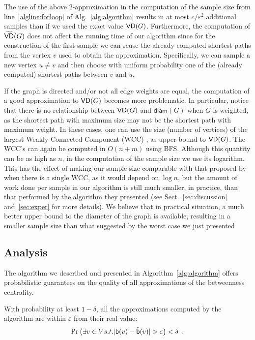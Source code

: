 The use of the above $2$-approximation in the computation of the
sample size from line~\ref{algline:forloop} of Alg.~\ref{alg:algorithm} results
in at most $c/\varepsilon^2$ additional samples than if we
used the exact value $\mathsf{VD}(G)$. Furthermore, the computation of $\widetilde{\mathsf{VD}}(G)$
does not affect the running time of our algorithm since for the construction of
the first sample we can reuse the already computed shortest paths from the
vertex $v$ used to obtain the approximation. Specifically, we can sample a new
vertex $u\neq v$ and then choose with uniform probability one of the
(already computed) shortest paths between $v$ and $u$.

If the graph is directed and/or not all edge weights are equal, the computation of a good
approximation to $\mathsf{VD}(G)$ becomes more problematic. In particular, notice that
there is no relationship between $\mathsf{VD}(G)$ and $\mathsf{diam}(G)$ when $G$ is
weighted, as the shortest path with maximum size may not be the shortest path
with maximum weight. In these cases, one can use the size (number of vertices)
of the largest Weakly Connected Component (WCC) , as upper bound to $\mathsf{VD}(G)$.
The WCC's can again be computed in $O(n+m)$ using BFS. Although this quantity
can be as high as $n$, in the computation of the sample size we use its
logarithm. This has the effect of making our sample size comparable with that
proposed by~\citet{BrandesP07} when there is a single WCC, as it would depend on
$\log n$, but the amount of work done per sample in our algorithm is still much
smaller, in practice, than that performed by the algorithm they presented (see
Sect.~\ref{sec:discussion} and~\ref{sec:exper} for more details). We believe
that in practical situation, a much better upper bound to the diameter of the
graph is available, resulting in a smaller sample size than what suggested by
the worst case we just presented

\subsection{Analysis}\label{sec:analysis}
The algorithm we described and presented in Algorithm~\ref{alg:algorithm} offers
probabilistic guarantees on the quality of all approximations of the betweenness
centrality.
\begin{lemma}\label{lem:correctness}
  With probability at least $1-\delta$, all the approximations computed by the
  algorithm are within $\varepsilon$ from their real value:
  \[
  \Pr\left(\exists v\in V \mbox{ s.t. }
  |\betw(v)-\tilde\betw(v)|>\varepsilon\right)<\delta\enspace .
  \]
\end{lemma}

